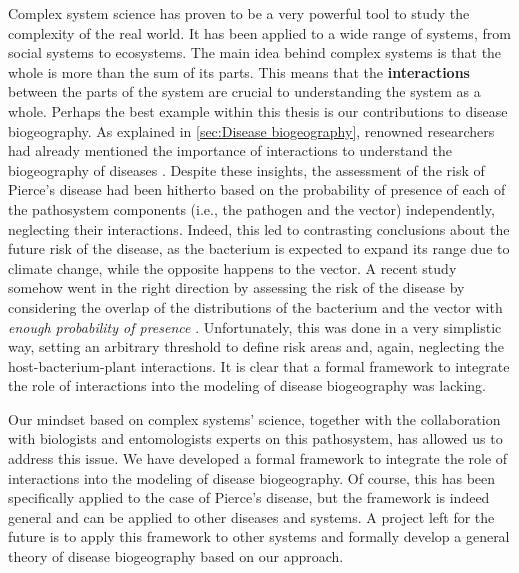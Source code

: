 Complex system science has proven to be a very powerful tool to study the
complexity of the real world. It has been applied to a wide range of systems,
from social systems to ecosystems. The main idea behind complex systems is that
the whole is more than the sum of its parts. This means that the
\textbf{interactions} between the parts of the system are crucial to
understanding the system as a whole. Perhaps the best example within this
thesis is our contributions to disease biogeography. As explained in
\cref{sec:Disease biogeography}, renowned researchers had already mentioned the
importance of interactions to understand the biogeography of diseases
\cite{Peterson2008}. Despite these insights, the assessment of the risk of
Pierce's disease had been hitherto based on the probability of presence of each
of the pathosystem components (i.e., the pathogen and the vector)
independently, neglecting their interactions. Indeed, this led to contrasting
conclusions about the future risk of the disease, as the bacterium is expected
to expand its range due to climate change, while the opposite happens to the
vector. A recent study somehow went in the right direction by assessing the
risk of the disease by considering the overlap of the distributions of the
bacterium and the vector with \textit{enough probability of presence}
\cite{YoonLee2023}. Unfortunately, this was done in a very simplistic way,
setting an arbitrary threshold to define risk areas and, again, neglecting the
host-bacterium-plant interactions. It is clear that a formal framework to
integrate the role of interactions into the modeling of disease biogeography
was lacking.

Our mindset based on complex systems' science, together with the collaboration
with biologists and entomologists experts on this pathosystem, has allowed us
to address this issue. We have developed a formal framework to integrate the
role of interactions into the modeling of disease biogeography. Of course,
this has been specifically applied to the case of Pierce's disease, but the
framework is indeed general and can be applied to other diseases and systems.
A project left for the future is to apply this framework to other systems and
formally develop a general theory of disease biogeography based on our
approach.

